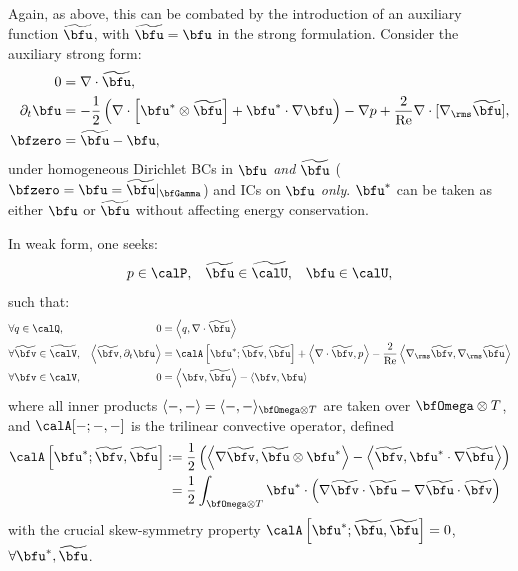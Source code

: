     Again, as above, this can be combated by the introduction of an auxiliary function $\widetilde{\bfu}$, with $\widetilde{\bfu}  =  \bfu$ in the strong formulation. Consider the auxiliary strong form:
    \begin{align}
                       0  &=  \nabla\cdot\widetilde{\bfu},  \\
        \partial_{t}\bfu  &=  - \frac{1}{2}\left(\nabla\cdot\left[\bfu^{*}\otimes\widetilde{\bfu}\right] + \bfu^{*}\cdot\nabla\bfu\right) - \nabla p + \frac{2}{\rmRe}\nabla\cdot[\nabla_{\rms}\widetilde{\bfu}],  \\
                 \bfzero  &=  \widetilde{\bfu} - \bfu,
    \end{align}
    under homogeneous Dirichlet BCs in $\bfu$ \emph{and} $\widetilde{\bfu}$ ($\bfzero  =  \bfu  =  \widetilde{\bfu}|_{\bfGamma}$) and ICs on $\bfu$ \emph{only}. $\bfu^{*}$ can be taken as either $\bfu$ or $\widetilde{\bfu}$ without affecting energy conservation.
    
    In weak form, one seeks:
    \begin{align}
                       p  \in  \calP,  &&
        \widetilde{\bfu}  \in  \widetilde{\calU},  &&
                    \bfu  \in  \calU,
    \end{align}
    such that:
    \begin{align}
        &\forall                 q  \in  \calQ,              &                                                            0  &=  \left\langle q, \nabla\cdot\widetilde{\bfu}\right\rangle  \\
        &\forall  \widetilde{\bfv}  \in  \widetilde{\calV},  &  \left\langle\widetilde{\bfv}, \partial_{t}\bfu\right\rangle  &=  \calA\left[\bfu^{*}; \widetilde{\bfv}, \widetilde{\bfu}\right] + \left\langle\nabla\cdot\widetilde{\bfv}, p\right\rangle - \frac{2}{\rmRe}\left\langle\nabla_{\rms}\widetilde{\bfv}, \nabla_{\rms}\widetilde{\bfu}\right\rangle  \\
        &\forall              \bfv  \in  \calV,              &                                                            0  &=  \left\langle\bfv, \widetilde{\bfu}\right\rangle - \left\langle\bfv, \bfu\right\rangle
    \end{align}
    where all inner products $\langle -, -\rangle  =  \langle -, -\rangle_{\bfOmega\otimes T}$ are taken over $\bfOmega\otimes T$, and $\calA[-; -, -]$ is the trilinear convective operator, defined
    \begin{align}
        \calA\left[\bfu^{*}; \widetilde{\bfv}, \widetilde{\bfu}\right]  :=  &\;\frac{1}{2}\left(\left\langle\nabla\widetilde{\bfv}, \widetilde{\bfu}\otimes\bfu^{*}\right\rangle - \left\langle\widetilde{\bfv}, \bfu^{*}\cdot\nabla\widetilde{\bfu}\right\rangle\right)  \label{eqn:convective operator definition}  \\
        =  &\;\frac{1}{2}\int_{\bfOmega\otimes T}\bfu^{*}\cdot\left(\nabla\widetilde{\bfv}\cdot\widetilde{\bfu} - \nabla\widetilde{\bfu}\cdot\widetilde{\bfv}\right)
    \end{align}
    with the crucial skew-symmetry property $\calA\left[\bfu^{*}; \widetilde{\bfu}, \widetilde{\bfu}\right] 
     =  0$, $\forall \bfu^{*}, \widetilde{\bfu}$.

